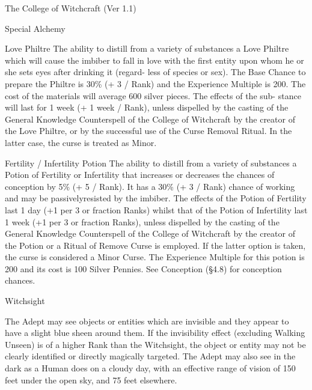 \begin{Chapter}{The College of Witchcraft (Ver 1.1)}
\begin{talent}[T-2]{Special Alchemy}
\begin{effects}
\begin{Description}
\item[Love Philtre] The ability to distill from a variety of
  substances a Love Philtre which will cause the imbiber to fall in
  love with the first entity upon whom he or she sets eyes after
  drinking it (regard- less of species or sex). The Base Chance to
  prepare the Philtre is 30\% (+ 3 / Rank) and the Experience Multiple
  is 200.  The cost of the materials will average 600 silver pieces.
  The effects of the sub- stance will last for 1 week (+ 1 week /
  Rank), unless dispelled by the casting of the General Knowledge
  Counterspell of the College of Witchcraft by the creator of the Love
  Philtre, or by the successful use of the Curse Removal Ritual. In
  the latter case, the curse is treated as Minor.

\item[Fertility / Infertility] Potion The ability to distill from a
  variety of substances a Potion of Fertility or Infertility that
  increases or decreases the chances of conception by 5\% (+ 5 /
  Rank). It has a 30\% (+ 3 / Rank) chance of working and may be
  passivelyresisted by the imbiber. The effects of the Potion of
  Fertility last 1 day (+1 per 3 or fraction Ranks) whilst that of the
  Potion of Infertility last 1 week (+1 per 3 or fraction Ranks),
  unless dispelled by the casting of the General Knowledge
  Counterspell of the College of Witchcraft by the creator of the
  Potion or a Ritual of Remove Curse is employed. If the latter option
  is taken, the curse is considered a Minor Curse.  The Experience
  Multiple for this potion is 200 and its cost is 100 Silver
  Pennies. See Conception (§4.8) for conception chances.
\end{Description}
\end{effects}
\end{talent}

\begin{talent}[T-3]{Witchsight}

\begin{effects}
The Adept may see objects or entities which are invisible and they
appear to have a slight blue sheen around them.  If the invisibility
effect (excluding Walking Unseen) is of a higher Rank than the
Witchsight, the object or entity may not be clearly identified or
directly magically targeted.  The Adept may also see in the dark as a
Human does on a cloudy day, with an effective range of vision of 150
feet under the open sky, and 75 feet elsewhere.
\end{effects}
\end{talent}


\end{Chapter}
